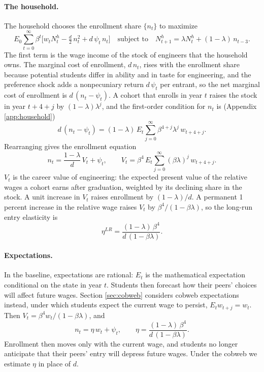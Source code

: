 \documentclass[12pt]{article}
\begin{document}
\paragraph{The household.} The household chooses the enrollment share $\{n_t\}$ to maximize
\begin{equation}\label{eq:household}
  E_0 \sum_{t=0}^{\infty} \beta^{t}
  \Big[ w_t N^{h}_t - \tfrac{d}{2}\, n_t^{2} + d\,\psi_t\, n_t \Big]
  \quad \text{subject to} \quad
  N^{h}_{t+1} = \lambda N^{h}_t + (1-\lambda)\, n_{t-3} .
\end{equation}
The first term is the wage income of the stock of engineers that the household owns. The marginal cost of enrollment, $d\,n_t$, rises with the enrollment share because potential students differ in ability and in taste for engineering, and the preference shock adds a nonpecuniary return $d\,\psi_t$ per entrant, so the net marginal cost of enrollment is $d\,(n_t - \psi_t)$. A cohort that enrolls in year $t$ raises the stock in year $t+4+j$ by $(1-\lambda)\lambda^{j}$, and the first-order condition for $n_t$ is (Appendix \ref{app:household})
\begin{equation}\label{eq:hhfocmain}
  d\,(n_t - \psi_t) = (1-\lambda)\, E_t \sum_{j=0}^{\infty} \beta^{4+j} \lambda^{j}\, w_{t+4+j} .
\end{equation}
Rearranging gives the enrollment equation
\begin{equation}\label{eq:enrollment}
  n_t = \frac{1-\lambda}{d}\, V_t + \psi_t , \qquad
  V_t = \beta^{4}\, E_t \sum_{j=0}^{\infty} (\beta\lambda)^{j}\, w_{t+4+j} .
\end{equation}
$V_t$ is the career value of engineering: the expected present value of the relative wages a cohort earns after graduation, weighted by its declining share in the stock. A unit increase in $V_t$ raises enrollment by $(1-\lambda)/d$. A permanent 1 percent increase in the relative wage raises $V_t$ by $\beta^{4}/(1-\beta\lambda)$, so the long-run entry elasticity is
\begin{equation}\label{eq:lrelasticity}
  \eta^{LR} = \frac{(1-\lambda)\,\beta^{4}}{d\,(1-\beta\lambda)} .
\end{equation}

\paragraph{Expectations.} In the baseline, expectations are rational: $E_t$ is the mathematical expectation conditional on the state in year $t$. Students then forecast how their peers' choices will affect future wages. Section \ref{sec:cobweb} considers cobweb expectations instead, under which students expect the current wage to persist, $E_t w_{t+j} = w_t$. Then $V_t = \beta^{4} w_t/(1-\beta\lambda)$, and
\begin{equation}\label{eq:cobweb}
  n_t = \eta\, w_t + \psi_t, \qquad \eta = \frac{(1-\lambda)\,\beta^{4}}{d\,(1-\beta\lambda)} .
\end{equation}
Enrollment then moves only with the current wage, and students no longer anticipate that their peers' entry will depress future wages. Under the cobweb we estimate $\eta$ in place of $d$.
\end{document}
